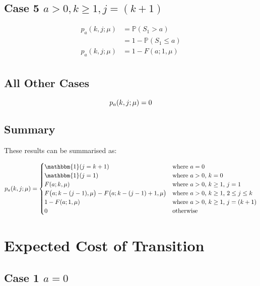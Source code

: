 \documentclass{article}
\begin{document}
\subsection{Case 5 $a > 0, k \geq 1, j = (k + 1)$}

\begin{align*}
	p_{a} (k, j; \mu) & = \mathbb{P} (S_{1} > a) \\
	& = 1 - \mathbb{P} (S_{1} \leq a) \\
	p_{a} (k, j; \mu) & = 1 - F (a; 1, \mu) \\
\end{align*}

\subsection{All Other Cases}

\begin{equation*}
	p_{a} (k, j; \mu) = 0 \\
\end{equation*}

\subsection{Summary}

These results can be summarised as:

\begin{equation}
	p_{a} (k, j; \mu) = \begin{cases} \mathbbm{1} (j = k + 1) & \text{where $a = 0$} \\
						\mathbbm{1} (j = 1) & \text{where $a > 0$, $k = 0$} \\
						F (a; k, \mu) & \text{where $a > 0$, $k \geq 1$, $j = 1$} \\
						F \big( a; k - (j - 1), \mu \big) - F \big( a; k - (j - 1) + 1, \mu \big) & \text{where $a > 0$, $k \geq 1$, $2 \leq j \leq k$} \\
						1 - F (a; 1, \mu) & \text{where $a > 0$, $k \geq 1$, $j = (k + 1)$} \\
						0 & \text{otherwise} \end{cases}
\end{equation}

\section{Expected Cost of Transition}

\subsection{Case 1 $a = 0$}
\end{document}
